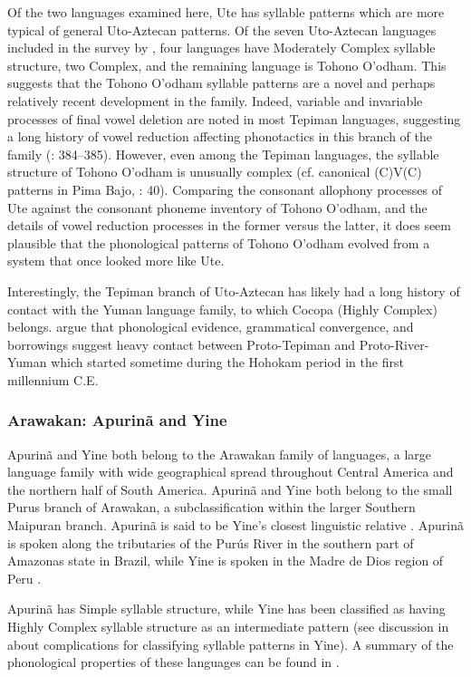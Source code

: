   Of the two languages examined here, Ute has syllable patterns which are more typical of general Uto-Aztecan patterns. Of the seven Uto-Aztecan languages included in the survey by \citet{Maddieson2013a}, four languages have Moderately Complex syllable structure, two Complex, and the remaining language is Tohono O’odham. This suggests that the Tohono O’odham syllable patterns are a novel and perhaps relatively recent development in the family. Indeed, variable and invariable processes of final vowel deletion are noted in most Tepiman languages, suggesting a long history of vowel reduction affecting phonotactics in this branch of the family (\citealt{ShaulHill1998}: 384--385). However, even among the Tepiman languages, the syllable structure of Tohono O’odham is unusually complex (cf. canonical (C)V(C) patterns in Pima Bajo,  \citealt{EstradaFernández2014}: 40). Comparing the consonant allophony processes of Ute against the consonant phoneme inventory of Tohono O’odham, and the details of vowel reduction processes in the former versus the latter, it does seem plausible that the phonological patterns of Tohono O’odham evolved from a system that once looked more like Ute.

  Interestingly, the Tepiman branch of Uto-Aztecan has likely had a long history of contact with the Yuman language family, to which Cocopa (Highly Complex) belongs. \citet{ShaulHill1998} argue that phonological evidence, grammatical convergence, and borrowings suggest heavy contact between Proto-Tepiman and Proto-River-Yuman which started sometime during the Hohokam period in the first millennium C.E.

\subsubsection{{Arawakan:} {Apurinã} {and} {Yine}}\label{sec:8.4.3.2}

  Apurinã and Yine both belong to the Arawakan family of languages, a large language family with wide geographical spread throughout Central America and the northern half of South America. Apurinã and Yine both belong to the small Purus branch of Arawakan, a subclassification within the larger Southern Maipuran branch. Apurinã is said to be Yine’s closest linguistic relative \citep{Facundes2002}. Apurinã is spoken along the tributaries of the Purús River in the southern part of Amazonas state in Brazil, while Yine is spoken in the Madre de Dios region of Peru \citep{Aikhenvald1999}.

  Apurinã has Simple syllable structure, while Yine has been classified as having Highly Complex syllable structure as an intermediate pattern (see discussion in  about complications for classifying syllable patterns in Yine). A summary of the phonological properties of these languages can be found in .

